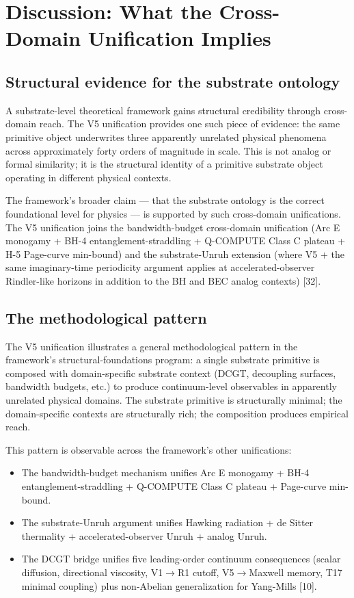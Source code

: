 \documentclass[11pt,a4paper]{article}
\begin{document}
\section{Discussion: What the Cross-Domain Unification Implies}

\subsection{Structural evidence for the substrate ontology}

A substrate-level theoretical framework gains structural credibility through cross-domain reach. The V5 unification provides one such piece of evidence: the same primitive object underwrites three apparently unrelated physical phenomena across approximately forty orders of magnitude in scale. This is not analog or formal similarity; it is the structural identity of a primitive substrate object operating in different physical contexts.

The framework's broader claim --- that the substrate ontology is the correct foundational level for physics --- is supported by such cross-domain unifications. The V5 unification joins the bandwidth-budget cross-domain unification (Arc E monogamy + BH-4 entanglement-straddling + Q-COMPUTE Class C plateau + H-5 Page-curve min-bound) and the substrate-Unruh extension (where V5 + the same imaginary-time periodicity argument applies at accelerated-observer Rindler-like horizons in addition to the BH and BEC analog contexts) [32].

\subsection{The methodological pattern}

The V5 unification illustrates a general methodological pattern in the framework's structural-foundations program: a single substrate primitive is composed with domain-specific substrate context (DCGT, decoupling surfaces, bandwidth budgets, etc.) to produce continuum-level observables in apparently unrelated physical domains. The substrate primitive is structurally minimal; the domain-specific contexts are structurally rich; the composition produces empirical reach.

This pattern is observable across the framework's other unifications:
\begin{itemize}[noitemsep]
\item The bandwidth-budget mechanism unifies Arc E monogamy + BH-4 entanglement-straddling + Q-COMPUTE Class C plateau + Page-curve min-bound.
\item The substrate-Unruh argument unifies Hawking radiation + de Sitter thermality + accelerated-observer Unruh + analog Unruh.
\item The DCGT bridge unifies five leading-order continuum consequences (scalar diffusion, directional viscosity, V1$\to$R1 cutoff, V5$\to$Maxwell memory, T17 minimal coupling) plus non-Abelian generalization for Yang-Mills [10].
\end{itemize}
\end{document}

